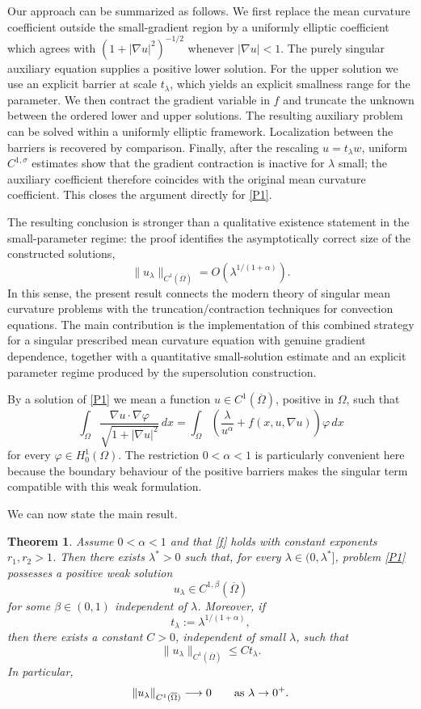 \documentclass[11pt,leqno]{amsart}
\newtheorem{theorem}{Theorem}[section]
\begin{document}
Our approach can be summarized as follows. We first replace the mean
curvature coefficient outside the small-gradient region by a uniformly
elliptic coefficient which agrees with
$(1+|\nabla u|^2)^{-1/2}$ whenever $|\nabla u|<1$. The purely singular
auxiliary equation supplies a positive lower solution. For the upper
solution we use an explicit barrier at scale $t_\lambda$, which yields
an explicit smallness range for the parameter. We then contract the
gradient variable in $f$ and truncate the unknown between the ordered
lower and upper solutions. The resulting auxiliary problem can be
solved within a uniformly elliptic framework. Localization between the
barriers is recovered by comparison. Finally, after the rescaling
$u=t_\lambda w$, uniform $C^{1,\sigma}$ estimates show that the
gradient contraction is inactive for $\lambda$ small; the auxiliary
coefficient therefore coincides with the original mean curvature
coefficient. This closes the argument directly for \eqref{P1}.

The resulting conclusion is stronger than a qualitative existence
statement in the small-parameter regime: the proof identifies the
asymptotically correct size of the constructed solutions,
\[
\|u_\lambda\|_{C^1(\overline\Omega)}
=O\!\left(\lambda^{1/(1+\alpha)}\right).
\]
In this sense, the present result connects the modern theory of singular
mean curvature problems with the truncation/contraction techniques for
convection equations. The main contribution is the implementation of
this combined strategy for a singular prescribed mean curvature
equation with genuine gradient dependence, together with a quantitative
small-solution estimate and an explicit parameter regime produced by
the supersolution construction.

By a solution of \eqref{P1} we mean a function
$u\in C^1(\overline\Omega)$, positive in $\Omega$, such that
\[
\int_\Omega
\frac{\nabla u\cdot\nabla\varphi}
{\sqrt{1+|\nabla u|^2}}\,dx
=
\int_\Omega
\left(\frac{\lambda}{u^\alpha}
+f(x,u,\nabla u)\right)\varphi\,dx
\]
for every $\varphi\in H_0^1(\Omega)$. The restriction $0<\alpha<1$ is
particularly convenient here because the boundary behaviour of the
positive barriers makes the singular term compatible with this weak
formulation.

We can now state the main result.

\begin{theorem}\label{main result}
Assume $0<\alpha<1$ and that \eqref{f} holds with constant exponents
$r_1,r_2>1$. Then there exists $\lambda^*>0$ such that, for every
$\lambda\in(0,\lambda^*]$, problem \eqref{P1} possesses a positive weak
solution
\[
u_\lambda\in C^{1,\beta}(\overline\Omega)
\]
for some $\beta\in(0,1)$ independent of $\lambda$. Moreover, if
\[
t_\lambda:=\lambda^{1/(1+\alpha)},
\]
then there exists a constant $C>0$, independent of small $\lambda$, such
that
\[
\|u_\lambda\|_{C^1(\overline\Omega)}
\le Ct_\lambda.
\]
In particular,
\[
\|u_\lambda\|_{C^1(\overline\Omega)}
\longrightarrow0
\qquad\hbox{as }\lambda\to0^+.
\]
\end{theorem}
\end{document}

